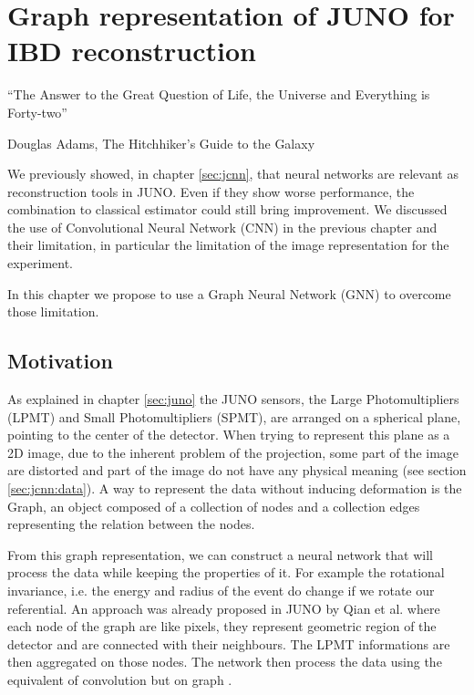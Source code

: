 \documentclass[../main.tex]{subfiles}
\begin{document}
\chapter{Graph representation of JUNO for IBD reconstruction}
\epigraph{``The Answer to the Great Question of Life, the Universe and Everything is Forty-two''}{Douglas Adams, The Hitchhiker’s Guide to the Galaxy}
\label{sec:jgnn}

We previously showed, in chapter \ref{sec:jcnn}, that neural networks are relevant as reconstruction tools in JUNO. Even if they show worse performance, the combination to classical estimator could still bring improvement. We discussed the use of Convolutional Neural Network (CNN) in the previous chapter and their limitation, in particular the limitation of the image representation for the experiment.

In this chapter we propose to use a Graph Neural Network (GNN) to overcome those limitation.

\section{Motivation}
\label{sec:jgnn:motiv}

As explained in chapter \ref{sec:juno} the JUNO sensors, the Large Photomultipliers (LPMT) and Small Photomultipliers (SPMT), are arranged on a spherical plane, pointing to the center of the detector. When trying to represent this plane as a 2D image, due to the inherent problem of the projection, some part of the image are distorted and part of the image do not have any physical meaning (see section  \ref{sec:jcnn:data}). A way to represent the data without inducing deformation is the Graph, an object composed of a collection of nodes and a collection edges representing the relation between the nodes.

From this graph representation, we can construct a neural network that will process the data while keeping the properties of it. For example the rotational invariance, i.e. the energy and radius of the event do change if we rotate our referential. An approach was already proposed in JUNO by Qian et al. \cite{qian_vertex_2021} where each node of the graph are like pixels, they represent geometric region of the detector and are connected with their neighbours. The LPMT informations are then aggregated on those nodes. The network then process the data using the equivalent of convolution but on graph \cite{defferrard_convolutional_2017}.
\end{document}
